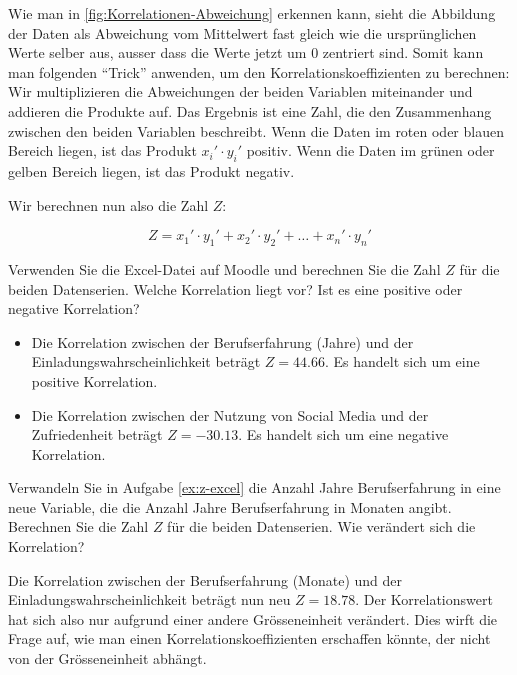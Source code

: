 Wie man in \cref{fig:Korrelationen-Abweichung} erkennen kann, sieht die Abbildung der Daten als Abweichung vom Mittelwert fast gleich wie die ursprünglichen Werte selber aus, ausser dass die Werte jetzt um 0 zentriert sind. Somit kann man folgenden \enquote{Trick} anwenden, um den Korrelationskoeffizienten zu berechnen: Wir multiplizieren die Abweichungen der beiden Variablen miteinander und addieren die Produkte auf. Das Ergebnis ist eine Zahl, die den Zusammenhang zwischen den beiden Variablen beschreibt. Wenn die Daten im roten oder blauen Bereich liegen, ist das Produkt \(x_i' \cdot y_i'\) positiv. Wenn die Daten im grünen oder gelben Bereich liegen, ist das Produkt negativ.

Wir berechnen nun also die Zahl \(Z\):

\[
	Z = x_1' \cdot y_1' + x_2' \cdot y_2' + \dots + x_n' \cdot y_n'
\]


\begin{myexercise}\label{ex:z-excel}
	Verwenden Sie die Excel-Datei auf Moodle und berechnen Sie die Zahl \(Z\) für die beiden Datenserien. Welche Korrelation liegt vor? Ist es eine positive oder negative Korrelation?
	\begin{myanswer}
		\begin{itemize}
			\item Die Korrelation zwischen der Berufserfahrung (Jahre) und der Einladungswahrscheinlichkeit beträgt \(Z = 44.66\). Es handelt sich um eine positive Korrelation.
			\item Die Korrelation zwischen der Nutzung von Social Media und der Zufriedenheit beträgt \(Z = -30.13\). Es handelt sich um eine negative Korrelation.
		\end{itemize}
	\end{myanswer}
\end{myexercise}
\begin{myexercise}\label{ex:z-excel2}
	Verwandeln Sie in Aufgabe \cref{ex:z-excel} die Anzahl Jahre Berufserfahrung in eine neue Variable, die die Anzahl Jahre Berufserfahrung in Monaten angibt. Berechnen Sie die Zahl \(Z\) für die beiden Datenserien. Wie verändert sich die Korrelation?
	\begin{myanswer}
		Die Korrelation zwischen der Berufserfahrung (Monate) und der Einladungswahrscheinlichkeit beträgt nun neu \(Z = 18.78\). Der Korrelationswert hat sich also nur aufgrund einer andere Grösseneinheit verändert. Dies wirft die Frage auf, wie man einen Korrelationskoeffizienten erschaffen könnte, der nicht von der Grösseneinheit abhängt.
	\end{myanswer}
\end{myexercise}

